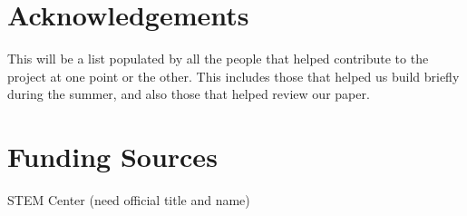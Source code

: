\documentclass[preprint,12pt]{elsarticle}
\begin{document}
\section{Acknowledgements}
\label{Acknowledgements}
This will be a list populated by all the people that helped contribute to the project at one point or the other.  This includes those that helped us build briefly during the summer, and also those that helped review our paper.

\section{Funding Sources}
\label{funding}
STEM Center (need official title and name)






\end{document}
